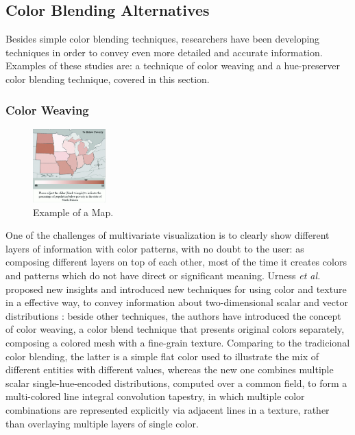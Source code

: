 \subsection{Color Blending Alternatives}
Besides simple color blending techniques, researchers have been developing techniques in order to convey
even more detailed and accurate information. Examples of these studies are:
a technique of color weaving and a hue-preserver color blending technique, covered in this section.
%
\subsubsection{Color Weaving}
%
\begin{figure}
	\centering
    \vspace{-\baselineskip}
    \includegraphics[width=0.25\textwidth]{images/background/WeavingTest1.png}
    \caption[Color Weaving - First Study]{Example of a Map.
    \protect\cite{Hagh-Shenas2007}}
    \label{fig:weaving2}
\end{figure}
%
One of the challenges of multivariate visualization
is to clearly show different layers of information with color patterns, with no doubt to the user: as
composing different layers on top of each other, most of the time it creates colors and patterns which
do not have direct or significant meaning. Urness \emph{et al.} proposed new insights and introduced new
techniques for using color and texture in a effective way, to convey information about two-dimensional
scalar and vector distributions \cite{Urness2003}: beside other techniques, the authors have introduced the concept
of color weaving, a color blend technique that presents original colors separately, composing a colored
mesh with a fine-grain texture. Comparing to the tradicional color blending, the latter is a simple flat
color used to illustrate the mix of different entities with different values, whereas the new one
combines multiple scalar single-hue-encoded distributions, computed over a common field, to form a
multi-colored line integral convolution tapestry, in which multiple color combinations are represented
explicitly via adjacent lines in a texture, rather than overlaying multiple layers of single color. \par
